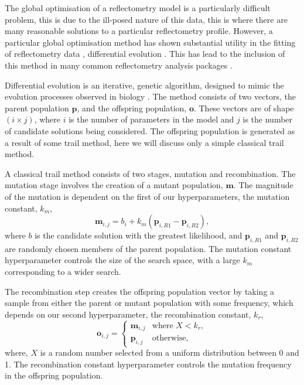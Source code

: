 \documentclass[
 reprint,
 superscriptaddress,
 amsmath,amssymb,
 aps,
]{revtex4-1}
\begin{document}
The global optimisation of a reflectometry model is a particularly difficult problem, this is due to the ill-posed nature of this data, this is where there are many reasonable solutions to a particular reflectometry profile.
However, a particular global optimisation method has shown substantial utility in the fitting of reflectometry data \cite{varderlee_comparison_2007}, differential evolution \cite{wormington_characterization_1999}.
This has lead to the inclusion of this method in many common reflectometry analysis packages \cite{bjorck_fitting_2011}.

Differential evolution is an iterative, genetic algorithm, designed to mimic the evolution processes observed in biology \cite{holland_adaptation_1992}.
The method consists of two vectors, the parent population $\mathbf{p}$, and the offspring population, $\mathbf{o}$. 
These vectors are of shape $(i \times j)$, where $i$ is the number of parameters in the model and $j$ is the number of candidate solutions being considered. 
The offspring population is generated as a result of some trail method, here we will discuss only a simple classical trail method.

A classical trail method consists of two stages, mutation and recombination. 
The mutation stage involves the creation of a mutant population, $\mathbf{m}$. 
The magnitude of the mutation is dependent on the first of our hyperparameters, the mutation constant, $k_m$, 
%
\begin{equation}
    \mathbf{m}_{i,j} = b_i + k_m (\mathbf{p}_{i, R1} - \mathbf{p}_{i, R2}),
\end{equation}
%
where $b$ is the candidate solution with the greatest likelihood, and $\mathbf{p}_{i, R1}$ and $\mathbf{p}_{i, R2}$ are randomly chosen members of the parent population. 
The mutation constant hyperparameter controls the size of the search space, with a large $k_m$ corresponding to a wider search. 

The recombination step creates the offspring population vector by taking a sample from either the parent or mutant population with some frequency, which depends on our second hyperparameter, the recombination constant, $k_r$,
%
\begin{equation}
    \mathbf{o}_{i, j} = 
    \begin{cases}
        \mathbf{m}_{i, j} & \text{where } X < k_r,\\
        \mathbf{p}_{i, j} & \text{otherwise},
    \end{cases}
\end{equation}
%
where, $X$ is a random number selected from a uniform distribution between 0 and 1. 
The recombination constant hyperparameter controls the mutation frequency in the offspring population. 
\end{document}
